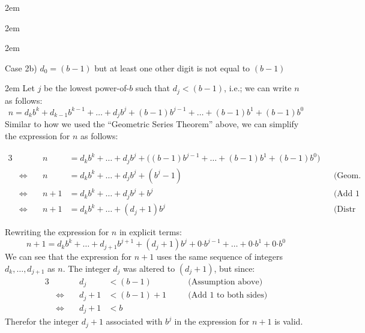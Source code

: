 \documentclass{article}
\newenvironment{jprIn}{\begin{adjustwidth}{2em}{}}{\end{adjustwidth}}
\begin{document}
\begin{jprIn}
\begin{jprIn}
\begin{jprIn}
\bigskip
\end{jprIn}
Case 2b) $d_0=(b-1)$ but at least one other digit is not equal to $(b-1)$
\begin{jprIn}
Let $j$ be the lowest power-of-$b$ such that $d_j<(b{-}1)$,
i.e.; we can write $n$ as follows:
\[n = d_kb^k+d_{k-1}b^{k-1}+\dots+d_jb^j+(b{-}1)b^{j-1}+\dots+(b{-}1)b^1+(b{-}1)b^0\]
Similar to how we used the ``Geometric Series Theorem'' above, we can simplify the expression for $n$ as follows:
\begin{small}
\begin{alignat*}{3}
  &&n
  &= d_kb^k+\dots+d_jb^j+\big((b{-}1)b^{j-1}+\dots+(b{-}1)b^1+(b{-}1)b^0\big)&&\\
  &\Leftrightarrow\quad
  &n
  &= d_kb^k+\dots+d_jb^j+(b^j-1) &&\text{(Geom. Series Thm.)}\\
  &\Leftrightarrow\quad
  &n+1
  &=  d_kb^k+\dots+d_jb^j+b^j &&\text{(Add 1 to both sides)}\\
  &\Leftrightarrow\quad
  &n+1
  &=  d_kb^k+\dots+(d_j+1)b^j &&\text{(Distr Axiom)}
\end{alignat*}
\end{small}
Rewriting the expression for $n$ in explicit terms:
\[n+1= d_kb^k+\dots+d_{j+1}b^{j+1}+(d_j+1)b^j+0{\cdot{}}{}b^{j-1}+\dots{}+0{\cdot{}}b^1+0{\cdot{}}b^0\]
We can see that the expression for $n+1$ uses the same sequence of integers $d_k,\dots{},d_{j+1}$ as $n$.
The integer $d_j$ was altered to $(d_j{+}1)$, but since:
\begin{alignat*}{3}
  &&d_j
  &< (b-1) &&\quad\text{(Assumption above)}\\
  &\Leftrightarrow\quad
  &d_j+1
  &< (b-1)+1 &&\quad\text{(Add 1 to both sides)}\\  
  &\Leftrightarrow\quad
  &d_j+1
  &< b
\end{alignat*}
Therefor the integer $d_j+1$ associated with $b^j$ in the expression for $n+1$ is valid.


\end{jprIn}
\end{jprIn}
\end{jprIn}
\end{document}
